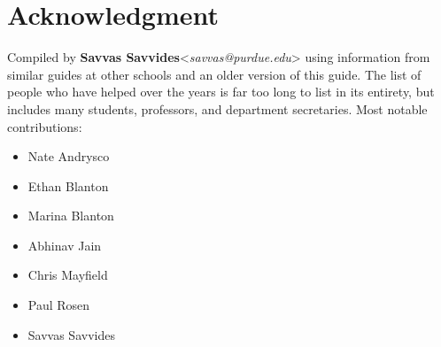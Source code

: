 \section{Acknowledgment}
Compiled by \textbf{Savvas Savvides}<\emph{savvas@purdue.edu}> using information from similar guides at other schools and an older version of this guide.
%
The list of people who have helped over the years is far too long to list in its entirety, but includes many students, professors, and department secretaries. Most notable contributions:

\begin{itemize}
\item Nate Andrysco
\item Ethan Blanton
\item Marina Blanton
\item Abhinav Jain
\item Chris Mayfield
\item Paul Rosen
\item Savvas Savvides
\end{itemize}